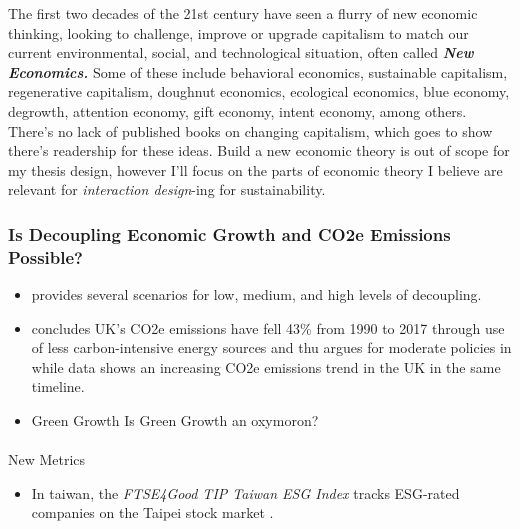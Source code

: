 \documentclass[
  letterpaper,
  DIV=11,
  numbers=noendperiod]{scrartcl}
\makeatletter
\let\oldparagraph\paragraph
\renewcommand{\paragraph}{
    \@ifstar
      \xxxParagraphStar
      \xxxParagraphNoStar
  }
\newcommand{\xxxParagraphStar}[1]{\oldparagraph*{#1}\mbox{}}
\newcommand{\xxxParagraphNoStar}[1]{\oldparagraph{#1}\mbox{}}
\providecommand{\tightlist}{%
  \setlength{\itemsep}{0pt}\setlength{\parskip}{0pt}}\usepackage{longtable,booktabs,array}
\makeatother
\begin{document}
The first two decades of the 21st century have seen a flurry of new
economic thinking, looking to challenge, improve or upgrade capitalism
to match our current environmental, social, and technological situation,
often called \textbf{\emph{New Economics.}} Some of these include
behavioral economics, sustainable capitalism, regenerative capitalism,
doughnut economics, ecological economics, blue economy, degrowth,
attention economy, gift economy, intent economy, among others. There's
no lack of published books on changing capitalism, which goes to show
there's readership for these ideas. Build a new economic theory is out
of scope for my thesis design, however I'll focus on the parts of
economic theory I believe are relevant for \emph{interaction design}-ing
for sustainability.

\subsubsection{Is Decoupling Economic Growth and CO2e Emissions
Possible?}\label{is-decoupling-economic-growth-and-co2e-emissions-possible}

\begin{itemize}
\tightlist
\item
  \citep{keysserDegrowthScenariosSuggest2021} provides several scenarios
  for low, medium, and high levels of decoupling.
\item
  \citep{harrissonAnalysisWhyUK2019} concludes UK's CO2e emissions have
  fell 43\% from 1990 to 2017 through use of less carbon-intensive
  energy sources and thu argues for moderate policies in
  \citep{hausfatherEmissionsBusinessUsual2020} while
  \citep{globalcarbonbudgetCumulativeCOEmissions2023} data shows an
  increasing CO2e emissions trend in the UK in the same timeline.
\item
  Green Growth Is Green Growth an oxymoron?
\end{itemize}

\paragraph{New Metrics}\label{new-metrics}

\begin{itemize}
\tightlist
\item
  In taiwan, the \emph{FTSE4Good TIP Taiwan ESG Index} tracks ESG-rated
  companies on the Taipei stock market
  \citep{taiwanindexTIPTaiWanZhiShuGongSi2024}.
\end{itemize}
\end{document}
